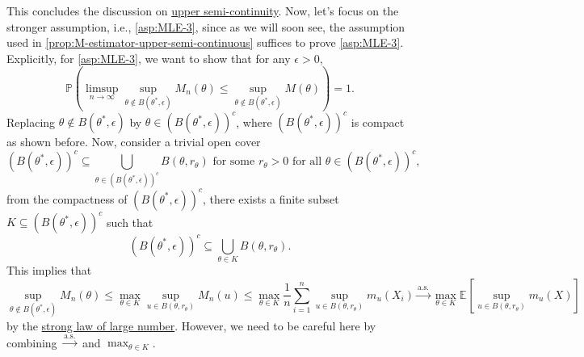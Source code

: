 This concludes the discussion on \hyperref[def:upper-semi-continuous]{upper semi-continuity}. Now, let's focus on the stronger assumption, i.e., \autoref{asp:MLE-3}, since as we will soon see, the assumption used in \autoref{prop:M-estimator-upper-semi-continuous} suffices to prove \autoref{asp:MLE-3}. Explicitly, for \autoref{asp:MLE-3}, we want to show that for any \(\epsilon > 0\),
\[
	\mathbb{P} \left( \limsup_{n \to \infty} \sup _{\theta \notin B(\theta ^{\ast} , \epsilon )} M_n(\theta ) \leq \sup _{\theta \notin B(\theta ^{\ast} , \epsilon )} M(\theta ) \right)
	= 1.
\]
Replacing \(\theta \notin B(\theta ^{\ast} , \epsilon )\) by \(\theta \in (B(\theta ^{\ast} , \epsilon ))^{c} \), where \((B(\theta ^{\ast} , \epsilon ))^{c}\) is compact as shown before. Now, consider a trivial open cover
\[
	(B(\theta ^{\ast} , \epsilon ))^{c}
	\subseteq \bigcup_{\theta \in (B(\theta ^{\ast} , \epsilon ))^{c} } B(\theta , r_\theta ) \text{ for some } r_\theta > 0 \text{ for all } \theta \in (B(\theta ^{\ast} , \epsilon ))^{c} ,
\]
from the compactness of \((B(\theta ^{\ast} , \epsilon ))^{c} \), there exists a finite subset \(K \subseteq (B(\theta ^{\ast} , \epsilon ))^{c} \) such that
\[
	(B(\theta ^{\ast} , \epsilon ))^{c}
	\subseteq \bigcup_{\theta \in K} B(\theta , r_\theta ).
\]
This implies that
\[
	\sup _{\theta \notin B(\theta ^{\ast} , \epsilon )} M_n(\theta )
	\leq \max _{\theta \in K} \sup _{u \in B(\theta , r_\theta )} M_n(u)
	\leq \max _{\theta \in K} \frac{1}{n}\sum_{i=1}^{n} \sup _{u \in B(\theta , r_\theta )} m_u(X_i)
	\overset{\text{a.s.} }{\to} \max _{\theta \in K} \mathbb{E}_{}\left[\sup _{u \in B(\theta , r_\theta )} m_u(X) \right]
\]
by the \hyperref[thm:SLLN]{strong law of large number}. However, we need to be careful here by combining \(\overset{\text{a.s.} }{\to} \) and \(\max _{\theta \in K}\).

